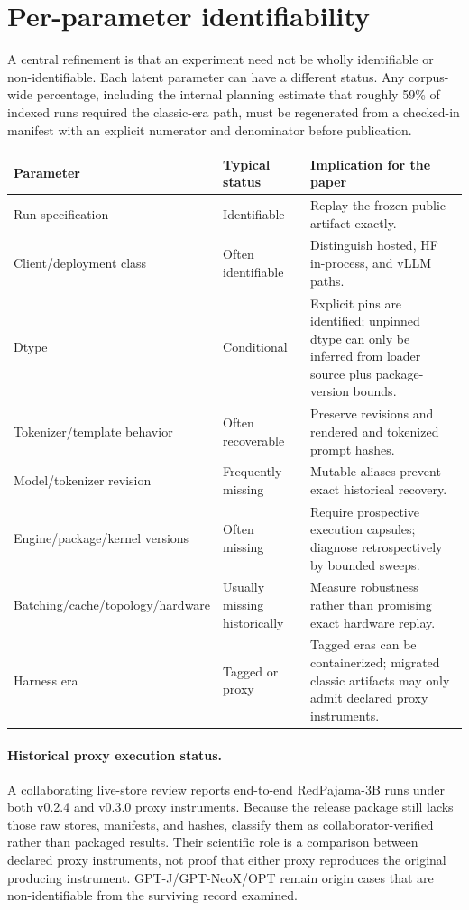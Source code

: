 \documentclass[11pt]{article}
\begin{document}
\section{Per-parameter identifiability}

A central refinement is that an experiment need not be wholly identifiable or
non-identifiable. Each latent parameter can have a different status. Any corpus-wide
percentage, including the internal planning estimate that roughly 59\% of indexed
runs required the classic-era path, must be regenerated from a checked-in manifest
with an explicit numerator and denominator before publication.

\begin{longtable}{@{}p{}p{}p{}@{}}
\toprule Parameter & Typical status & Implication for the paper \\
\midrule\endhead
Run specification & Identifiable & Replay the frozen public artifact exactly. \\
Client/deployment class & Often identifiable & Distinguish hosted, HF in-process,
and vLLM paths. \\
Dtype & Conditional & Explicit pins are identified; unpinned dtype can only be
inferred from loader source plus package-version bounds. \\
Tokenizer/template behavior & Often recoverable & Preserve revisions and rendered
and tokenized prompt hashes. \\
Model/tokenizer revision & Frequently missing & Mutable aliases prevent exact
historical recovery. \\
Engine/package/kernel versions & Often missing & Require prospective execution
capsules; diagnose retrospectively by bounded sweeps. \\
Batching/cache/topology/hardware & Usually missing historically & Measure robustness
rather than promising exact hardware replay. \\
Harness era & Tagged or proxy & Tagged eras can be containerized; migrated classic
artifacts may only admit declared proxy instruments. \\
\bottomrule
\end{longtable}


\paragraph{Historical proxy execution status.}
A collaborating live-store review reports end-to-end RedPajama-3B runs under both
v0.2.4 and v0.3.0 proxy instruments. Because the release package still lacks those
raw stores, manifests, and hashes, classify them as collaborator-verified rather than
packaged results. Their scientific role is a comparison between declared proxy
instruments, not proof that either proxy reproduces the original producing
instrument. GPT-J/GPT-NeoX/OPT remain origin cases that are non-identifiable from the
surviving record examined.
\end{document}
